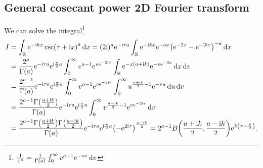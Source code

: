 \documentclass[english, parskip=full]{scrartcl}
\begin{document}
\subsection{General cosecant power 2D Fourier transform}
We can solve the integral\footnote{$\frac{1}{x^a} = \frac{1}{\Gamma(a)} \int_{0}^{\infty} v^{a-1} \text{e}^{-vx} \,\mathrm{d}v$}
\begin{align}
I &= \intr{\powe{-\i kx} \csc(\tau + \i x)^a}{x} = (2\i)^a \powe{-\i \tau a} \intr{\powe{-\i kx} \powe{-ax} \kla*{\powe{-2x} - \powe{-2\i \tau}}^{-a}}{x}\\
&= \frac{2^a}{\Gamma(a)} \powe{-\i \tau a} \powe{\i \frac{\pi}{2}a} \intx{0}{\infty}{ v^{a-1} \powe{v \powe{-2\i\tau}} \intr{\powe{-x (a + \i k)} \powe{-v \powe{-2x}}}{x} }{v}\\
&= \frac{2^{a-1}}{\Gamma(a)} \powe{-\i \tau a} \powe{\i \frac{\pi}{2}a} \intx{0}{\infty}{ v^{a-1} \powe{v \powe{-2\i\tau}} \intx{0}{\infty}{u^{\frac{a+\i k}{2}-1} \powe{-vu}}{u} }{v}\\
&= \frac{2^{a-1} \Gamma\kla*{\frac{a+\i k}{2}}}{\Gamma(a)} \powe{-\i\tau a} \powe{\i \frac{\pi}{2}a} \intx{0}{\infty}{ v^{\frac{a-\i k}{2}-1} \powe{v\powe{-2\i\tau}}}{v}\\
&= \frac{2^{a-1} \Gamma\kla*{\frac{a+\i k}{2}} \Gamma\kla*{\frac{a-\i k}{2}}}{\Gamma(a)} \powe{-\i\tau a} \powe{\i \frac{\pi}{2}a} \kla*{-\powe{2\i\tau}}^\frac{a-\i k}{2} = 2^{a-1} B\kla*{\frac{a+\i k}{2}, \frac{a-\i k}{2}} \powe{k\kla*{\tau - \frac{\pi}{2}}}.
\end{align}
\end{document}
